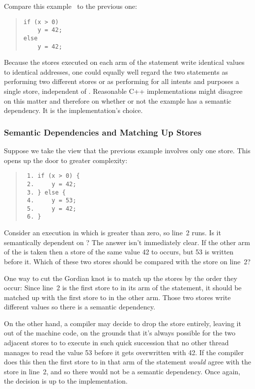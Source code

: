 Compare this example~\cite{Howells2009membartxt} to the previous one:
\begin{quote}
\begin{verbatim}
if (x > 0)
    y = 42;
else
    y = 42;
\end{verbatim}
\end{quote}
Because the stores executed on each arm of the  statement write
identical values to identical addresses, one could equally well regard
the two statements as performing two different stores or as performing
for all intents and purposes a single store, independent of .
Reasonable C++ implementations might disagree on this matter and
therefore on whether or not the example has a semantic dependency.
It is the implementation's choice.

\subsubsection{Semantic Dependencies and Matching Up Stores}
\label{sec:Semantic Dependencies and Matching Up Stores}

Suppose we take the view that the previous example involves only one
store.
This opens up the door to greater complexity:
\begin{quote}
\begin{verbatim}
 1. if (x > 0) {
 2.     y = 42;
 3. } else {
 4.     y = 53;
 5.     y = 42;
 6. }
\end{verbatim}
\end{quote}
Consider an execution in which  is greater than zero, so line~2
runs.
Is it semantically dependent on ?
The answer isn't immediately clear.
If the other arm of the  is taken then a store of the same value 42 to
 occurs, but 53 is written before it.
Which of these two stores should be compared with the store on line~2?

One way to cut the Gordian knot is to match up the stores by the order
they occur:
Since line~2 is the first store to  in its arm of the 
statement, it should be matched up with the first store to  in
the other arm.
Those two stores write different values so there is a semantic
dependency.

On the other hand, a compiler may decide to drop the  store entirely, leaving it out of the machine code,
on the grounds that it's always possible for the two adjacent stores
to  to execute in such quick succession that no other thread
manages to read the value 53 before it gets overwritten with 42.
If the compiler does this then the first store to  in that
arm of the  statement \emph{would} agree with the store in
line~2, and so there would not be a semantic dependency.
Once again, the decision is up to the implementation.

